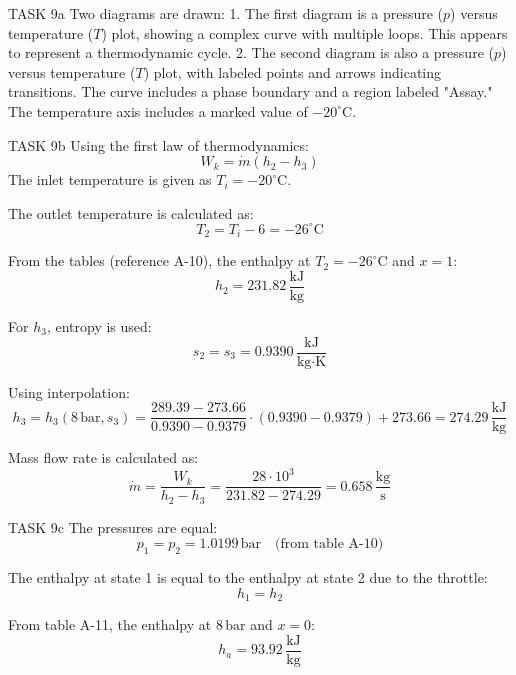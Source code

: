 TASK 9a  
Two diagrams are drawn:  
1. The first diagram is a pressure (\(p\)) versus temperature (\(T\)) plot, showing a complex curve with multiple loops. This appears to represent a thermodynamic cycle.  
2. The second diagram is also a pressure (\(p\)) versus temperature (\(T\)) plot, with labeled points and arrows indicating transitions. The curve includes a phase boundary and a region labeled "Assay." The temperature axis includes a marked value of \(-20^\circ\text{C}\).  

TASK 9b  
Using the first law of thermodynamics:  
\[
W_k = \dot{m} (h_2 - h_3)
\]  
The inlet temperature is given as \(T_i = -20^\circ\text{C}\).  

The outlet temperature is calculated as:  
\[
T_2 = T_i - 6 = -26^\circ\text{C}
\]  

From the tables (reference A-10), the enthalpy at \(T_2 = -26^\circ\text{C}\) and \(x = 1\):  
\[
h_2 = 231.82 \, \frac{\text{kJ}}{\text{kg}}
\]  

For \(h_3\), entropy is used:  
\[
s_2 = s_3 = 0.9390 \, \frac{\text{kJ}}{\text{kg·K}}
\]  

Using interpolation:  
\[
h_3 = h_3(8 \, \text{bar}, s_3) = \frac{289.39 - 273.66}{0.9390 - 0.9379} \cdot (0.9390 - 0.9379) + 273.66 = 274.29 \, \frac{\text{kJ}}{\text{kg}}
\]  

Mass flow rate is calculated as:  
\[
\dot{m} = \frac{W_k}{h_2 - h_3} = \frac{28 \cdot 10^3}{231.82 - 274.29} = 0.658 \, \frac{\text{kg}}{\text{s}}
\]  

TASK 9c  
The pressures are equal:  
\[
p_1 = p_2 = 1.0199 \, \text{bar} \quad \text{(from table A-10)}
\]  

The enthalpy at state 1 is equal to the enthalpy at state 2 due to the throttle:  
\[
h_1 = h_2
\]  

From table A-11, the enthalpy at \(8 \, \text{bar}\) and \(x = 0\):  
\[
h_a = 93.92 \, \frac{\text{kJ}}{\text{kg}}
\]